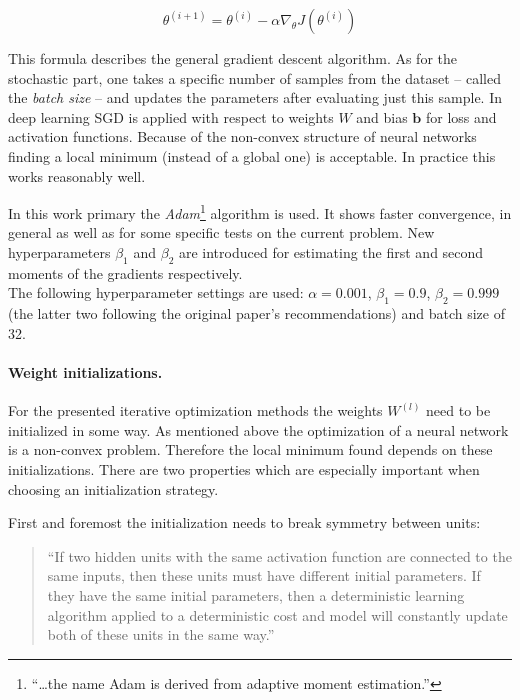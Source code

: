 \begin{equation}
	\theta^{(i+1)} = \theta^{(i)} - \alpha \nabla_{\theta}J(\theta^{(i)})
\end{equation}

This formula describes the general gradient descent algorithm. As for the stochastic part, one takes a specific number of samples from the dataset -- called the \emph{batch size} -- and updates the parameters after evaluating just this sample. In deep learning SGD is applied with respect to weights $W$ and bias $\mathbf{b}$ for loss and activation functions. Because of the non-convex structure of neural networks finding a local minimum (instead of a global one) is acceptable. In practice this works reasonably well.

In this work primary the \emph{Adam}\footnote{``\dots the name Adam is derived from adaptive moment estimation.''} algorithm is used.\cite{DBLP:journals/corr/KingmaB14} It shows faster convergence, in general as well as for some specific tests on the current problem. New hyperparameters $\beta_1$ and $\beta_2$ are introduced for estimating the first and second moments of the gradients respectively. \\ The following hyperparameter settings are used: $\alpha=0.001$, $\beta_1 = 0.9$, $\beta_2=0.999$ (the latter two following the original paper's recommendations) and batch size of 32.

\paragraph{Weight initializations.}
For the presented iterative optimization methods the weights $W^{(l)}$ need to be initialized in some way. As mentioned above the optimization of a neural network is a non-convex problem. Therefore the local minimum found depends on these initializations. There are two properties which are especially important when choosing an initialization strategy.

First and foremost the initialization needs to break symmetry between units:

\begin{quote}
	``If two hidden units with the same activation function are connected to the same inputs, then these units must have different initial parameters. If they have the same initial
	parameters, then a deterministic learning algorithm applied to a deterministic cost
	and model will constantly update both of these units in the same way.''\cite[p.\,301]{Goodfellow-et-al-2016}
\end{quote}

